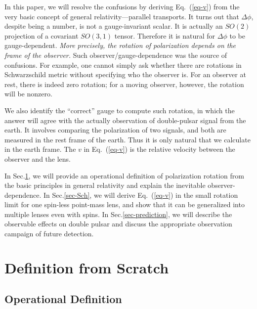 \documentclass[aps,showpacs,twocolumn,floats,prd,superscriptaddress,nofootinbib]{revtex4}
\begin{document}
In this paper, we will resolve the confusions by deriving Eq.~(\ref{eq-v}) from the very basic concept of general relativity---parallel transports. 
It turns out that $\Delta\phi$, despite being a number, is not a gauge-invariant scalar.
It is actually an $SO(2)$ projection of a covariant $SO(3,1)$ tensor.
Therefore it is natural for $\Delta\phi$ to be gauge-dependent.
 {\it More precisely, the rotation of polarization depends on the frame of the observer. }
Such observer/gauge-dependence was the source of confusions.
For example, one cannot simply ask whether there are rotations in Schwarzschild metric without specifying who the observer is.
For an observer at rest, there is indeed zero rotation; 
for a moving observer, however, the rotation will be nonzero.

We also identify the ``correct'' gauge to compute such rotation, in which the answer will agree with the actually observation of double-pulsar signal from the earth.
It involves comparing the polarization of two signals, and both are measured in the rest frame of the earth.
Thus it is only natural that we calculate in the earth frame.
The $v$ in Eq.~(\ref{eq-v}) is the relative velocity between the observer and the lens.

In Sec.\ref{sec-born}, we will provide an operational definition of polarization rotation from the basic principles in general relativity and explain the inevitable observer-dependence.
In Sec.\ref{sec-Sch}, we will derive Eq.~(\ref{eq-v}) in the small rotation limit for one spin-less point-mass lens, and show that it can be generalized into multiple lenses even with spins.
In Sec.\ref{sec-prediction}, we will describe the observable effects on double pulsar and discuss the appropriate observation campaign of future detection.

\section{Definition from Scratch}
\label{sec-born}

\subsection{Operational Definition}
\end{document}
